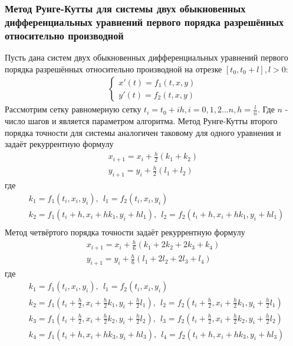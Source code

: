 \documentclass[a4paper,12pt,titlepage,finall]{article}
\begin{document}
\subsubsection{Метод Рунге-Кутты для системы двух обыкновенных дифференциальных уравнений первого порядка разрешённых относительно производной}
Пусть дана систем двух обыкновенных дифференциальных уравнений первого порядка разрешённых относительно производной на отрезке $[t_0, t_0 + l], l > 0$:
\begin{align*}
\begin{cases}
x'(t)=f_1(t,x,y)\\
y'(t)=f_2(t,x,y)
\end{cases}
\end{align*}
Рассмотрим сетку равномерную сетку $t_i = t_0 + ih, i = 0, 1, 2 ... n, h = \frac{l}{n}$. Где $n$ - число шагов и является параметром алгоритма. Метод Рунге-Кутты второго порядка точности для системы аналогичен таковому для одного уравнения и задаёт рекуррентную формулу
\begin{align*}
x_{i+1} = x_i + \frac{h}{2}(k_1 + k_2)\\
y_{i+1} = y_i + \frac{h}{2}(l_1 + l_2)
\end{align*}
где
\begin{align*}
&k_1 = f_1(t_i, x_i, y_i),~~ l_1 = f_2(t_i, x_i, y_i)\\
&k_2 = f_1(t_i + h, x_i + h k_1, y_i + h l_1),~~ l_2 = f_2(t_i + h, x_i + h k_1, y_i + h l_1)\\
\end{align*}
Метод четвёртого порядка точности задаёт рекуррентную формулу
\begin{align*}
x_{i+1} = x_i + \frac{h}{6}(k_1 + 2 k_2 + 2 k_3 + k_4)\\
y_{i+1} = y_i + \frac{h}{6}(l_1 + 2 l_2 + 2 l_3 + l_4)
\end{align*}
где
\begin{align*}
&k_1 = f_1(t_i, x_i, y_i), ~~ l_1 = f_2(t_i, x_i, y_i)\\
&k_2 = f_1(t_i + \frac{h}{2}, x_i + \frac{h}{2}k_1, y_i + \frac{h}{2}l_1), ~~ l_2 = f_2(t_i + \frac{h}{2}, x_i + \frac{h}{2}k_1, y_i + \frac{h}{2}l_1)\\
&k_3 = f_1(t_i + \frac{h}{2}, x_i + \frac{h}{2}k_2, y_i + \frac{h}{2}l_2), ~~ l_3 = f_2(t_i + \frac{h}{2}, x_i + \frac{h}{2}k_2, y_i + \frac{h}{2}l_2)\\
&k_4 = f_1(t_i + h, x_i + h k_3, y_i + h l_3), ~~ l_4 = f_2(t_i + h, x_i + h k_3, y_i + h l_3)
\end{align*}
\newpage
\end{document}
